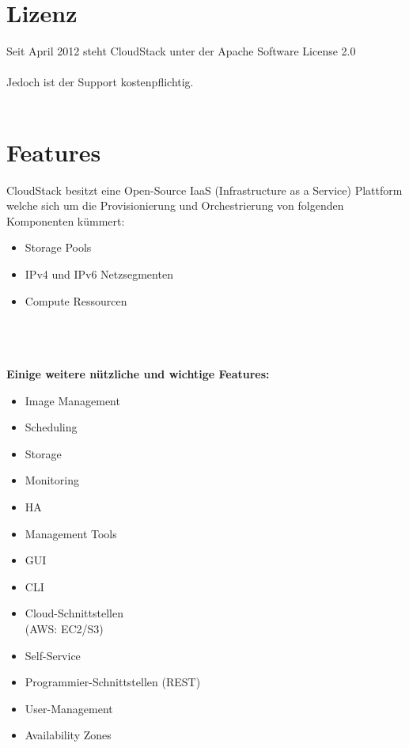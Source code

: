 \documentclass[a4paper,nochapterprefix,ngerman,12pt]{scrreprt}
\begin{document}
\section{Lizenz}
Seit April 2012 steht CloudStack unter der Apache Software License 2.0 \cite{apachehistory}\\\\
Jedoch ist der Support kostenpflichtig. \cite{computerwochecloudstack} \\\\
\section{Features}
CloudStack besitzt eine Open-Source IaaS (Infrastructure as a Service) Plattform welche sich um die Provisionierung und Orchestrierung von folgenden Komponenten kümmert:
\begin{itemize}
\item Storage Pools
\item IPv4 und IPv6 Netzsegmenten
\item Compute Ressourcen
\end{itemize}
\cite{vergleich}\\\\\\
\textbf{Einige weitere nützliche und wichtige Features:}
\begin{multicols}{2}
	\begin{itemize}
		\item Image Management
		\item Scheduling
		\item Storage
		\item Monitoring
		\item HA
		\item Management Tools
		\item GUI
		\item CLI
		\item Cloud-Schnittstellen \\(AWS: EC2/S3)
		\item Self-Service
		\item Programmier-Schnittstellen (REST)
		\item User-Management
		\item Availability Zones
	\end{itemize}
\end{multicols}

\newpage
\end{document}
